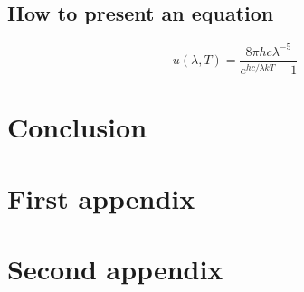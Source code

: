 \documentclass[12pt]{article}
\begin{document}
\blindduck[maths] \cite{refs1, refs2, refs3}

\subsection{How to present an equation}

\begin{equation}
    u(\lambda,T)=\frac{8\pi hc\lambda^{-5}}{e^{hc/\lambda kT}-1}
    \label{eq:1}
\end{equation}

\section{Conclusion}

\lipsum[1]




\appendix  
\clearpage
\addappheadtotoc 
\appendixpage 

\section{First appendix}

\lipsum[1]

\section{Second appendix}

\lipsum[1]
\end{document}
